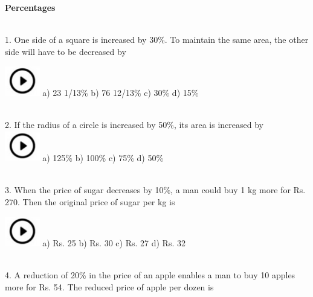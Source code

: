 \documentclass{article}
\begin{document}
\noindent \begin{center}
	{\Large \textbf{Percentages \\}}
\end{center}

\noindent 


\noindent 

\noindent 

\noindent \\ 1.   One side of a square is increased by 30\%. To maintain the same area, the other side will have to be decreased by

\noindent  \includegraphics*[width=0.60in, height=0.52in]{images/image1} a) 23 1/13\%            b) 76 12/13\%   c) 30\%              d) 15\%

\noindent 

\noindent 

\noindent \\ 2.   If the radius of a circle is increased by 50\%, its area is increased by\\

\noindent  \includegraphics*[width=0.60in, height=0.52in]{images/image1} a) 125\%                  b) 100\%            c) 75\%              d) 50\%

\noindent 

\noindent \\
3.   When the price of sugar decreases by 10\%, a man could buy 1 kg more for Rs. 270. Then the original price of sugar per kg is

\noindent   \includegraphics*[width=0.60in, height=0.52in]{images/image1} a) Rs. 25                      b) Rs. 30               c) Rs. 27               d) Rs. 32

\noindent 

\noindent 

\noindent \\
4.   A reduction of 20\% in the price of an apple enables a man to buy 10 apples more for Rs. 54. The reduced price of apple per dozen is
\end{document}
